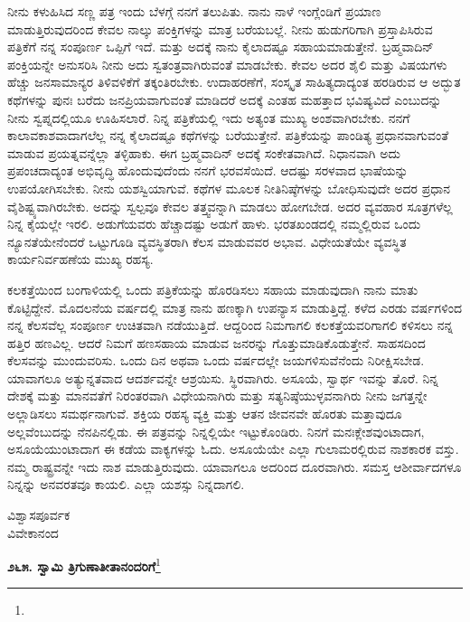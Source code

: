 ನೀನು ಕಳುಹಿಸಿದ ಸಣ್ಣ ಪತ್ರ ಇಂದು ಬೆಳಗ್ಗೆ ನನಗೆ ತಲುಪಿತು. ನಾನು ನಾಳೆ ಇಂಗ್ಲೆಂಡಿಗೆ ಪ್ರಯಾಣ ಮಾಡುತ್ತಿರುವುದರಿಂದ ಕೇವಲ ನಾಲ್ಕು ಪಂಕ್ತಿಗಳನ್ನು ಮಾತ್ರ ಬರೆಯಬಲ್ಲೆ. ನೀನು ಹುಡುಗರಿಗಾಗಿ ಪ್ರಸ್ತಾಪಿಸಿರುವ ಪತ್ರಿಕೆಗೆ ನನ್ನ ಸಂಪೂರ್ಣ ಒಪ್ಪಿಗೆ ಇದೆ. ಮತ್ತು ಅದಕ್ಕೆ ನಾನು ಕೈಲಾದಷ್ಟೂ ಸಹಾಯಮಾಡುತ್ತೇನೆ. ಬ್ರಹ್ಮವಾದಿನ್ ಪಂಕ್ತಿಯನ್ನೇ ಅನುಸರಿಸಿ ನೀನು ಅದು ಸ್ವತಂತ್ರವಾಗಿರುವಂತೆ ಮಾಡಬೇಕು. ಕೇವಲ ಅದರ ಶೈಲಿ ಮತ್ತು ವಿಷಯಗಳು ಹೆಚ್ಚು ಜನಸಾಮಾನ್ಯರ ತಿಳಿವಳಿಕೆಗೆ ತಕ್ಕಂತಿರಬೇಕು. ಉದಾಹರಣೆಗೆ, ಸಂಸ್ಕೃತ ಸಾಹಿತ್ಯದಾದ್ಯಂತ ಹರಡಿರುವ ಆ ಅದ್ಭುತ ಕಥೆಗಳನ್ನು ಪುನಃ ಬರೆದು ಜನಪ್ರಿಯವಾಗುವಂತೆ ಮಾಡಿದರೆ ಅದಕ್ಕೆ ಎಂತಹ ಮಹತ್ತಾದ ಭವಿಷ್ಯವಿದೆ ಎಂಬುದನ್ನು ನೀನು ಸ್ವಪ್ನದಲ್ಲಿಯೂ ಊಹಿಸಲಾರೆ. ನಿನ್ನ ಪತ್ರಿಕೆಯಲ್ಲಿ ಇದು ಅತ್ಯಂತ ಮುಖ್ಯ ಅಂಶವಾಗಿರಬೇಕು. ನನಗೆ ಕಾಲಾವಕಾಶವಾದಾಗಲೆಲ್ಲ ನನ್ನ ಕೈಲಾದಷ್ಟೂ ಕಥೆಗಳನ್ನು ಬರೆಯುತ್ತೇನೆ. ಪತ್ರಿಕೆಯನ್ನು ಪಾಂಡಿತ್ಯ ಪ್ರಧಾನವಾಗುವಂತೆ ಮಾಡುವ ಪ್ರಯತ್ನವನ್ನೆಲ್ಲಾ ತಳ್ಳಿಹಾಕು. ಈಗ ಬ್ರಹ್ಮವಾದಿನ್ ಅದಕ್ಕೆ ಸಂಕೇತವಾಗಿದೆ. ನಿಧಾನವಾಗಿ ಅದು ಪ್ರಪಂಚದಾದ್ಯಂತ ಅಭಿವೃದ್ಧಿ ಹೊಂದುವುದೆಂದು ನನಗೆ ಭರವಸೆಯಿದೆ. ಆದಷ್ಟು ಸರಳವಾದ ಭಾಷೆಯನ್ನು ಉಪಯೋಗಿಸಬೇಕು. ನೀನು ಯಶಸ್ವಿಯಾಗುವೆ. ಕಥೆಗಳ ಮೂಲಕ ನೀತಿನಿಷ್ಠೆಗಳನ್ನು ಬೋಧಿಸುವುದೇ ಅದರ ಪ್ರಧಾನ ವೈಶಿಷ್ಟ್ಯವಾಗಿರಬೇಕು. ಅದನ್ನು ಸ್ವಲ್ಪವೂ ಕೇವಲ ತತ್ತ್ವವನ್ನಾಗಿ ಮಾಡಲು ಹೋಗಬೇಡ. ಅದರ ವ್ಯವಹಾರ ಸೂತ್ರಗಳೆಲ್ಲ ನಿನ್ನ ಕೈಯಲ್ಲೇ ಇರಲಿ. ಅಡುಗೆಯವರು ಹೆಚ್ಚಾದಷ್ಟು ಅಡುಗೆ ಹಾಳು. ಭರತಖಂಡದಲ್ಲಿ ನಮ್ಮಲ್ಲಿರುವ ಒಂದು ನ್ಯೂನತೆಯೇನೆಂದರೆ ಒಟ್ಟುಗೂಡಿ ವ್ಯವಸ್ಥಿತರಾಗಿ ಕೆಲಸ ಮಾಡುವವರ ಅಭಾವ. ವಿಧೇಯತೆಯೇ ವ್ಯವಸ್ಥಿತ ಕಾರ್ಯನಿರ್ವಹಣೆಯ ಮುಖ್ಯ ರಹಸ್ಯ.

ಕಲಕತ್ತೆಯಿಂದ ಬಂಗಾಳಿಯಲ್ಲಿ ಒಂದು ಪತ್ರಿಕೆಯನ್ನು ಹೊರಡಿಸಲು ಸಹಾಯ ಮಾಡುವುದಾಗಿ ನಾನು ಮಾತು ಕೊಟ್ಟಿದ್ದೇನೆ. ಮೊದಲನೆಯ ವರ್ಷದಲ್ಲಿ ಮಾತ್ರ ನಾನು ಹಣಕ್ಕಾಗಿ ಉಪನ್ಯಾಸ ಮಾಡುತ್ತಿದ್ದೆ. ಕಳೆದ ಎರಡು ವರ್ಷಗಳಿಂದ ನನ್ನ ಕೆಲಸವೆಲ್ಲ ಸಂಪೂರ್ಣ ಉಚಿತವಾಗಿ ನಡೆಯುತ್ತಿದೆ. ಆದ್ದರಿಂದ ನಿಮಗಾಗಲಿ ಕಲಕತ್ತೆಯವರಿಗಾಗಲಿ ಕಳಿಸಲು ನನ್ನ ಹತ್ತಿರ ಹಣವಿಲ್ಲ. ಆದರೆ ನಿಮಗೆ ಹಣಸಹಾಯ ಮಾಡುವ ಜನರನ್ನು ಗೊತ್ತುಮಾಡಿಕೊಡುತ್ತೇನೆ. ಸಾಹಸದಿಂದ ಕೆಲಸವನ್ನು ಮುಂದುವರಿಸು. ಒಂದು ದಿನ ಅಥವಾ ಒಂದು ವರ್ಷದಲ್ಲೇ ಜಯಗಳಿಸುವೆನೆಂದು ನಿರೀಕ್ಷಿಸಬೇಡ. ಯಾವಾಗಲೂ ಅತ್ಯುನ್ನತವಾದ ಆದರ್ಶವನ್ನೇ ಆಶ್ರಯಿಸು. ಸ್ಥಿರವಾಗಿರು. ಅಸೂಯೆ, ಸ್ವಾರ್ಥ ಇವನ್ನು ತೊರೆ. ನಿನ್ನ ದೇಶಕ್ಕೆ ಮತ್ತು ಮಾನವತೆಗೆ ನಿರಂತರವಾಗಿ ವಿಧೇಯನಾಗಿರು ಮತ್ತು ಸತ್ಯನಿಷ್ಠೆಯುಳ್ಳವನಾಗಿರು\enginline{-} ನೀನು ಜಗತ್ತನ್ನೇ ಅಲ್ಲಾಡಿಸಲು ಸಮರ್ಥನಾಗುವೆ. ಶಕ್ತಿಯ ರಹಸ್ಯ ವ್ಯಕ್ತಿ ಮತ್ತು ಆತನ ಜೀವನವೇ ಹೊರತು ಮತ್ತಾವುದೂ ಅಲ್ಲವೆಂಬುದನ್ನು ನೆನಪಿನಲ್ಲಿಡು. ಈ ಪತ್ರವನ್ನು ನಿನ್ನಲ್ಲಿಯೇ ಇಟ್ಟುಕೊಂಡಿರು. ನಿನಗೆ ಮನಃಕ್ಲೇಶವುಂಟಾದಾಗ, ಅಸೂಯೆಯುಂಟಾದಾಗ ಈ ಕಡೆಯ ವಾಕ್ಯಗಳನ್ನು ಓದು. ಅಸೂಯೆಯೇ ಎಲ್ಲಾ ಗುಲಾಮರಲ್ಲಿರುವ ನಾಶಕಾರಕ ವಸ್ತು. ನಮ್ಮ ರಾಷ್ಟ್ರವನ್ನೇ ಇದು ನಾಶ ಮಾಡುತ್ತಿರುವುದು. ಯಾವಾಗಲೂ ಅದರಿಂದ ದೂರವಾಗಿರು. ಸಮಸ್ತ ಆಶೀರ್ವಾದಗಳೂ ನಿನ್ನನ್ನು ಅನವರತವೂ ಕಾಯಲಿ. ಎಲ್ಲಾ ಯಶಸ್ಸು ನಿನ್ನದಾಗಲಿ.
\vspace{-0.5cm}

{\flushright
ವಿಶ್ವಾಸಪೂರ್ವಕ\\ವಿವೇಕಾನಂದ\par}
\vspace{-0.3cm}

\begin{center}
\textbf{೨೬೫. ಸ್ವಾಮಿ ತ್ರಿಗುಣಾತೀತಾನಂದರಿಗೆ}\footnote{}
\end{center}
\vspace{-0.5cm}

